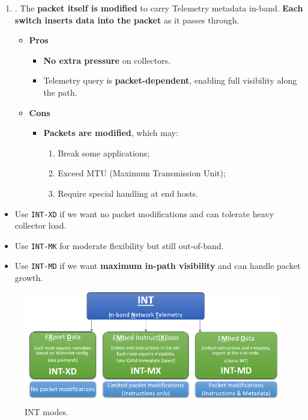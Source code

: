 \begin{enumerate}
    \item {}. The \textbf{packet itself is modified} to carry Telemetry metadata in-band. \textbf{Each switch inserts data into the packet} as it passes through.
    \begin{itemize}
        \item[\textcolor{Green3}{\faIcon{check-circle}}] \textcolor{Green3}{\textbf{Pros}}
        \begin{itemize}[label=\textcolor{Green3}{}]
            \item \textbf{No extra pressure} on collectors.
            \item Telemetry query is \textbf{packet-dependent}, enabling full visibility along the path.
        \end{itemize}

        \item[\textcolor{Red2}{\faIcon{times-circle}}] \textcolor{Red2}{\textbf{Cons}}
        \begin{itemize}[label=\textcolor{Red2}{}]
            \item \textbf{Packets are modified}, which may:
            \begin{enumerate}
                \item Break some applications;
                \item Exceed MTU (Maximum Transmission Unit);
                \item Require special handling at end hosts.
            \end{enumerate}
        \end{itemize}
    \end{itemize}
\end{enumerate}

\newpage

\begin{itemize}
    \item Use \texttt{INT-XD} if we want no packet modifications and can tolerate heavy collector load.
    \item Use \texttt{INT-MK} for moderate flexibility but still out-of-band.
    \item Use \texttt{INT-MD} if we want \textbf{maximum in-path visibility} and can handle packet growth.
\end{itemize}

\begin{figure}[!htp]
    \centering
    \includegraphics[width=\textwidth]{img/int-1.pdf}
    \caption{INT modes.}
\end{figure}

